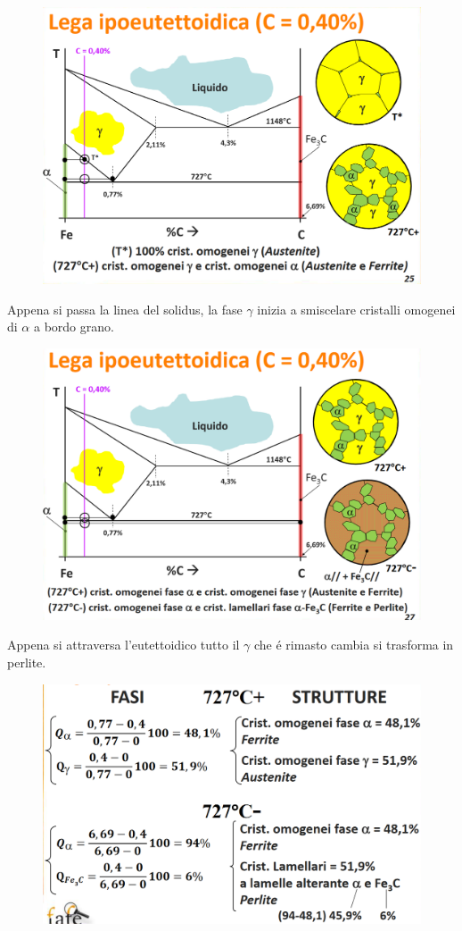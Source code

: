 \documentclass{article}
\begin{document}
{\begin{figure}[h!]
                \includegraphics[width=.8\linewidth]{L12 - Diagramma Fe-C - 0,40C - Cambio di Struttura 2.png}
            \end{figure}
            Appena si passa la linea del solidus, la fase $\gamma$ inizia a smiscelare cristalli omogenei di $\alpha$ a bordo grano.
            \begin{figure}[h!]
                \centering
                \includegraphics[width=.8\linewidth]{L12 - Diagramma Fe-C - 0,40C - Cambio di Struttura 3.png}
            \end{figure}
            Appena si attraversa l'eutettoidico tutto il $\gamma$ che \'e rimasto cambia si trasforma in perlite.
            \begin{figure}[h!]
                \centering
                \includegraphics[width=.8\linewidth]{L12 - Diagramma Fe-C - 0,40C - Calcolo all'eutettoidico.png}

\end{figure}}
\end{document}
